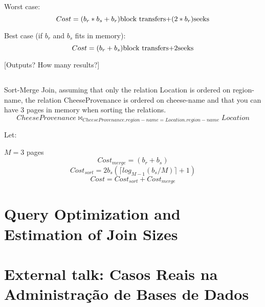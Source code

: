 \documentclass[11pt,report]{article}
\newcommand{\tab}{\hspace*{3em}}
\begin{document}
	Worst case:
	\begin{equation}Cost = (b_r * b_s + b_r) $block transfers$ + (2 * b_r) $seeks$\end{equation}

	Best case (if $b_r$ and $b_s$ fits in memory):
	\begin{equation}Cost = (b_r + b_s) $block transfers$+ 2 $seeks$\end{equation}

	{\color{red} [Outputs? How many results?]}

	\subsection{}
	{\color{gray}Sort-Merge Join, assuming that only the relation Location is ordered on region-name, the relation CheeseProvenance is ordered on cheese-name and that you can have 3 pages in memory when sorting the relations.}
	\begin{equation}CheeseProvenance \bowtie_{CheeseProvenance.region-name=Location.region-name} Location\end{equation}

	Let:

	\tab $M = 3$ pages
	\begin{equation}Cost_{merge} = (b_r + b_s) \end{equation}
	\begin{equation}Cost_{sort} = 2b_s(\lceil log_{M-1}(b_s/M) \rceil+1) \end{equation}
	\begin{equation}Cost = Cost_{sort} + Cost_{merge} \end{equation}	


\section{Query Optimization and Estimation of Join Sizes}
	
\section{External talk: Casos Reais na Administração de Bases de Dados}
	\subsection{}
	\subsection{}
\end{document}
